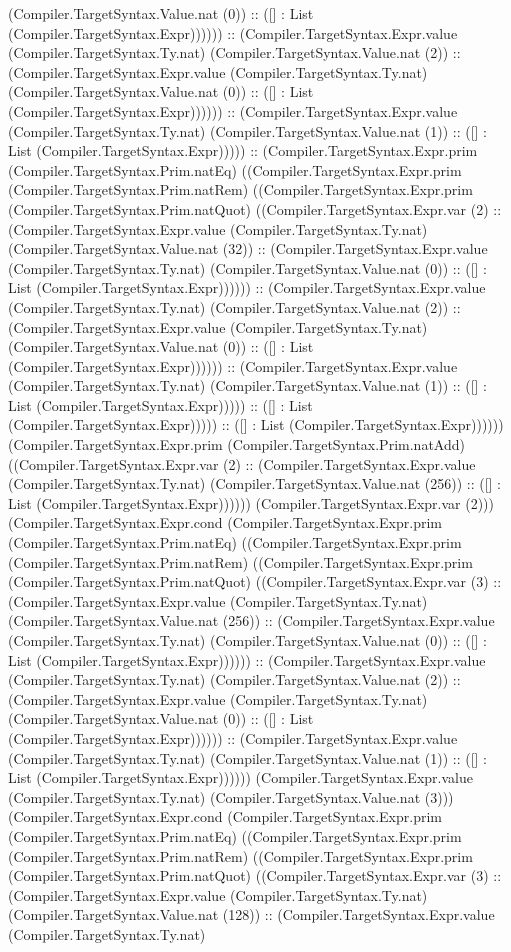 \documentclass[11pt]{article}
\begin{document}
(Compiler.TargetSyntax.Value.nat (0)) :: ([] : List (Compiler.TargetSyntax.Expr)))))) :: (Compiler.TargetSyntax.Expr.value (Compiler.TargetSyntax.Ty.nat) (Compiler.TargetSyntax.Value.nat (2)) :: (Compiler.TargetSyntax.Expr.value (Compiler.TargetSyntax.Ty.nat) (Compiler.TargetSyntax.Value.nat (0)) :: ([] : List (Compiler.TargetSyntax.Expr)))))) :: (Compiler.TargetSyntax.Expr.value (Compiler.TargetSyntax.Ty.nat) (Compiler.TargetSyntax.Value.nat (1)) :: ([] : List (Compiler.TargetSyntax.Expr))))) :: (Compiler.TargetSyntax.Expr.prim (Compiler.TargetSyntax.Prim.natEq) ((Compiler.TargetSyntax.Expr.prim (Compiler.TargetSyntax.Prim.natRem) ((Compiler.TargetSyntax.Expr.prim (Compiler.TargetSyntax.Prim.natQuot) ((Compiler.TargetSyntax.Expr.var (2) :: (Compiler.TargetSyntax.Expr.value (Compiler.TargetSyntax.Ty.nat) (Compiler.TargetSyntax.Value.nat (32)) :: (Compiler.TargetSyntax.Expr.value (Compiler.TargetSyntax.Ty.nat) (Compiler.TargetSyntax.Value.nat (0)) :: ([] : List (Compiler.TargetSyntax.Expr)))))) :: (Compiler.TargetSyntax.Expr.value (Compiler.TargetSyntax.Ty.nat) (Compiler.TargetSyntax.Value.nat (2)) :: (Compiler.TargetSyntax.Expr.value (Compiler.TargetSyntax.Ty.nat) (Compiler.TargetSyntax.Value.nat (0)) :: ([] : List (Compiler.TargetSyntax.Expr)))))) :: (Compiler.TargetSyntax.Expr.value (Compiler.TargetSyntax.Ty.nat) (Compiler.TargetSyntax.Value.nat (1)) :: ([] : List (Compiler.TargetSyntax.Expr))))) :: ([] : List (Compiler.TargetSyntax.Expr))))) :: ([] : List (Compiler.TargetSyntax.Expr)))))) (Compiler.TargetSyntax.Expr.prim (Compiler.TargetSyntax.Prim.natAdd) ((Compiler.TargetSyntax.Expr.var (2) :: (Compiler.TargetSyntax.Expr.value (Compiler.TargetSyntax.Ty.nat) (Compiler.TargetSyntax.Value.nat (256)) :: ([] : List (Compiler.TargetSyntax.Expr)))))) (Compiler.TargetSyntax.Expr.var (2))) (Compiler.TargetSyntax.Expr.cond (Compiler.TargetSyntax.Expr.prim (Compiler.TargetSyntax.Prim.natEq) ((Compiler.TargetSyntax.Expr.prim (Compiler.TargetSyntax.Prim.natRem) ((Compiler.TargetSyntax.Expr.prim (Compiler.TargetSyntax.Prim.natQuot) ((Compiler.TargetSyntax.Expr.var (3) :: (Compiler.TargetSyntax.Expr.value (Compiler.TargetSyntax.Ty.nat) (Compiler.TargetSyntax.Value.nat (256)) :: (Compiler.TargetSyntax.Expr.value (Compiler.TargetSyntax.Ty.nat) (Compiler.TargetSyntax.Value.nat (0)) :: ([] : List (Compiler.TargetSyntax.Expr)))))) :: (Compiler.TargetSyntax.Expr.value (Compiler.TargetSyntax.Ty.nat) (Compiler.TargetSyntax.Value.nat (2)) :: (Compiler.TargetSyntax.Expr.value (Compiler.TargetSyntax.Ty.nat) (Compiler.TargetSyntax.Value.nat (0)) :: ([] : List (Compiler.TargetSyntax.Expr)))))) :: (Compiler.TargetSyntax.Expr.value (Compiler.TargetSyntax.Ty.nat) (Compiler.TargetSyntax.Value.nat (1)) :: ([] : List (Compiler.TargetSyntax.Expr)))))) (Compiler.TargetSyntax.Expr.value (Compiler.TargetSyntax.Ty.nat) (Compiler.TargetSyntax.Value.nat (3))) (Compiler.TargetSyntax.Expr.cond (Compiler.TargetSyntax.Expr.prim (Compiler.TargetSyntax.Prim.natEq) ((Compiler.TargetSyntax.Expr.prim (Compiler.TargetSyntax.Prim.natRem) ((Compiler.TargetSyntax.Expr.prim (Compiler.TargetSyntax.Prim.natQuot) ((Compiler.TargetSyntax.Expr.var (3) :: (Compiler.TargetSyntax.Expr.value (Compiler.TargetSyntax.Ty.nat) (Compiler.TargetSyntax.Value.nat (128)) :: (Compiler.TargetSyntax.Expr.value (Compiler.TargetSyntax.Ty.nat) 
\end{document}
